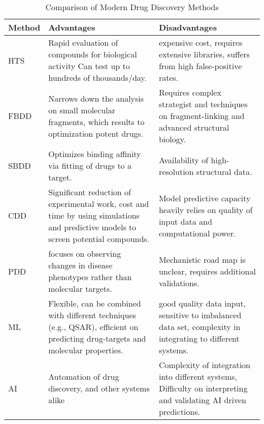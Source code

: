 \begin{table}[h] 
	\centering
	\begin{threeparttable}
		\renewcommand{\arraystretch}{1.2} 
		\small
		\begin{tabular}{p{4cm} p{6cm} p{6cm}}
			\hline
			\textbf{Method} & \textbf{Advantages} & \textbf{Disadvantages} \\
			\hline
			HTS \cite{martis2011highHTS} & Rapid evaluation of compounds for biological activity Can test up to hundreds of thousands/day.& expensive cost, requires extensive libraries, suffers from high false-positive rates. \\
			
			FBDD \cite{chen2025fragment} & Narrows down the analysis on small molecular fragments, which results to optimization potent drugs. & Requires complex strategist and techniques on fragment-linking and advanced structural biology. \\
			
			SBDD \cite{batool2019structure} & Optimizes binding affinity via fitting of drugs to a target. & Availability of high-resolution structural data. \\
			
			CDD \cite{batool2019structure} & Significant reduction of experimental work, cost and time by using simulations and predictive models to screen potential compounds. & Model predictive capacity heavily relies on quality of input data and computational power. \\
			
			PDD \cite{garaci2024PDD} & focuses on observing changes in disease phenotypes rather than molecular targets. & Mechanistic road map is unclear, requires additional validations. \\
			
			ML \cite{ammad2014integrative} & Flexible, can be combined with different techniques (e.g., QSAR), efficient on predicting drug-targets and molecular properties. & good quality data input, sensitive to imbalanced data set, complexity in integrating to different systems. \\
			
			AI \cite{article} & Automation of drug discovery, and other systems alike & Complexity of integration into different systems, Difficulty on interpreting and validating AI driven predictions. \\
			\hline
		\end{tabular}
	\end{threeparttable}
	\caption{Comparison of Modern Drug Discovery Methods} 
	\label{tab:modern_methods} %
\end{table}

